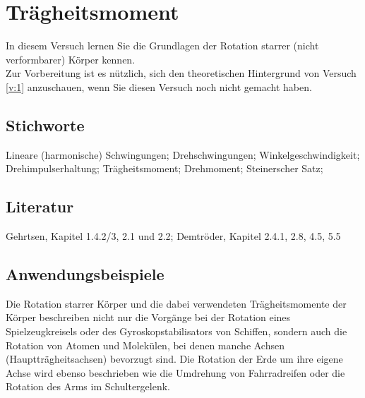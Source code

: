 \chapter{Trägheitsmoment}
\label{v:2}


In diesem Versuch lernen Sie die Grundlagen der Rotation starrer (nicht verformbarer) Körper kennen.\\
Zur Vorbereitung ist es nützlich, sich den theoretischen Hintergrund von Versuch \ref{v:1} anzuschauen, wenn Sie diesen Versuch noch nicht gemacht haben.
\section{Stichworte}
Lineare (harmonische) Schwingungen; Drehschwingungen; Winkelgeschwindigkeit; Drehimpulserhaltung; Trägheitsmoment; Drehmoment; Steinerscher Satz; 
%
\section{Literatur}
Gehrtsen, Kapitel 1.4.2/3, 2.1 und 2.2; Demtröder, Kapitel 2.4.1, 2.8, 4.5, 5.5
%
\section{Anwendungsbeispiele}
%
Die Rotation starrer Körper und die dabei verwendeten Trägheitsmomente der Körper beschreiben nicht nur die Vorgänge bei der Rotation eines Spielzeugkreisels oder des Gyroskopstabilisators von Schiffen, sondern auch die Rotation von Atomen und Molekülen, bei denen manche Achsen (Hauptträgheitsachsen) bevorzugt sind. Die Rotation der Erde um ihre eigene Achse wird ebenso beschrieben wie die Umdrehung von Fahrradreifen oder die Rotation des Arms im Schultergelenk.
%
